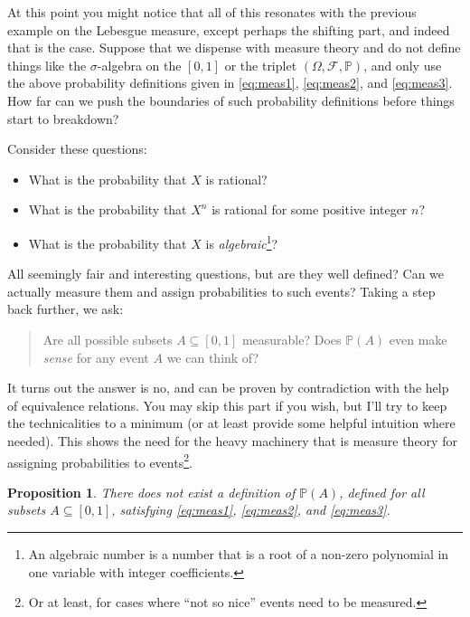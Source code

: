 \documentclass[
]{book}
\providecommand{\tightlist}{%
  \setlength{\itemsep}{0pt}\setlength{\parskip}{0pt}}
\newcommand{\bbP}{\mathbb{P}}
\newcommand{\cF}{{\mathcal F}}
\newtheorem{proposition}{Proposition}[chapter]
\theoremstyle{definition}
\theoremstyle{definition}
\theoremstyle{definition}
\theoremstyle{definition}
\theoremstyle{remark}
\begin{document}
At this point you might notice that all of this resonates with the previous example on the Lebesgue measure, except perhaps the shifting part, and indeed that is the case.
Suppose that we dispense with measure theory and do not define things like the \(\sigma\)-algebra on the \([0,1]\) or the triplet \((\Omega,\cF,\bbP)\), and only use the above probability definitions given in \eqref{eq:meas1}, \eqref{eq:meas2}, and \eqref{eq:meas3}.
How far can we push the boundaries of such probability definitions before things start to breakdown?

Consider these questions:

\begin{itemize}
\tightlist
\item
  What is the probability that \(X\) is rational?
\item
  What is the probability that \(X^n\) is rational for some positive integer \(n\)?
\item
  What is the probability that \(X\) is \emph{algebraic}\footnote{An algebraic number is a number that is a root of a non-zero polynomial in one variable with integer coefficients.}?
\end{itemize}

All seemingly fair and interesting questions, but are they well defined? Can we actually measure them and assign probabilities to such events? Taking a step back further, we ask:

\begin{quote}
Are all possible subsets \(A\subseteq [0,1]\) measurable? Does \(\bbP(A)\) even make \emph{sense} for any event \(A\) we can think of?
\end{quote}

It turns out the answer is no, and can be proven by contradiction with the help of equivalence relations.
You may skip this part if you wish, but I'll try to keep the technicalities to a minimum (or at least provide some helpful intuition where needed).
This shows the need for the heavy machinery that is measure theory for assigning probabilities to events\footnote{Or at least, for cases where ``not so nice'' events need to be measured.}.

\begin{proposition}
There does not exist a definition of \(\bbP(A)\), defined for all subsets \(A\subseteq[0,1]\), satisfying \eqref{eq:meas1}, \eqref{eq:meas2}, and \eqref{eq:meas3}.
\end{proposition}
\end{document}
